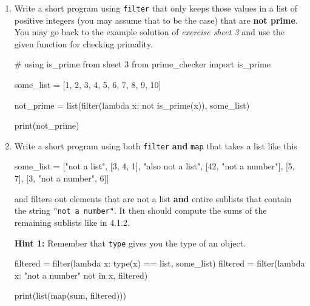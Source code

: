\begin{enumerate}
    \item Write a short program using {\tt filter} that only keeps those values in a list of positive integers (you may assume that to be the case) that are {\bf not prime}. You may go back to the example solution of {\it exercise sheet 3} and use the given function for checking primality.

    \vspace{1em}
    \begin{solution}
        \begin{pythoncode}
# using is_prime from sheet 3
from prime_checker import is_prime

some_list = [1, 2, 3, 4, 5, 6, 7, 8, 9, 10]

not_prime = list(filter(lambda x: not is_prime(x)), some_list)

print(not_prime)
        \end{pythoncode}
    \end{solution}

    \item Write a short program using both {\tt filter} {\bf and} {\tt map} that takes a list like this

    \begin{pythoncode}
some_list = ["not a list", [3, 4, 1], "also not a list", [42, "not a number"],
             [5, 7], [3, "not a number", 6]]
    \end{pythoncode}

    and filters out elements that are not a list {\bf and} entire sublists that contain the string {\tt "not a number"}. It then should compute the sums of the remaining sublists like in 4.1.2.

    \vspace{1em}

    {\bf Hint 1:} Remember that {\tt type} gives you the type of an object.

    \begin{solution}
        \begin{pythoncode}
filtered = filter(lambda x: type(x) == list, some_list)
filtered = filter(lambda x: "not a number" not in x, filtered)

print(list(map(sum, filtered)))
        \end{pythoncode}
    \end{solution}
\end{enumerate}


